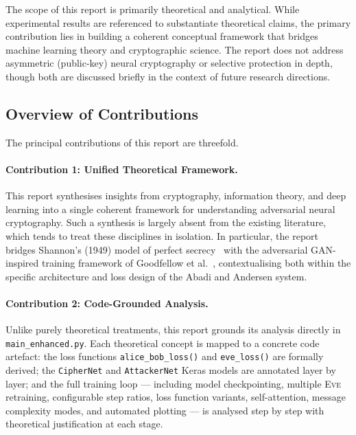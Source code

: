 \documentclass[12pt, a4paper]{article}
\newcommand{\eve}{\textsc{Eve}}
\newcommand{\code}[1]{\texttt{\color{CodeRed}#1}}
\begin{document}
\vspace{0.3cm}

The scope of this report is primarily theoretical and analytical.
While experimental results are referenced to substantiate theoretical
claims, the primary contribution lies in building a coherent conceptual
framework that bridges machine learning theory and cryptographic science.
The report does not address asymmetric (public-key) neural cryptography
or selective protection in depth, though both are discussed briefly in
the context of future research directions.

\subsection{Overview of Contributions}
\label{subsec:contributions}

The principal contributions of this report are threefold.

\paragraph{Contribution 1: Unified Theoretical Framework.}
This report synthesises insights from cryptography, information theory,
and deep learning into a single coherent framework for understanding
adversarial neural cryptography. Such a synthesis is largely absent from
the existing literature, which tends to treat these disciplines in
isolation. In particular, the report bridges Shannon's (1949) model of
perfect secrecy~\cite{shannon1949communication} with the adversarial
GAN-inspired training framework of Goodfellow et
al.~\cite{goodfellow2014generative}, contextualising both within the
specific architecture and loss design of the Abadi and Andersen system.

\paragraph{Contribution 2: Code-Grounded Analysis.}
Unlike purely theoretical treatments, this report grounds its analysis
directly in \code{main\_enhanced.py}. Each theoretical concept is
mapped to a concrete code artefact: the loss functions
\code{alice\_bob\_loss()} and \code{eve\_loss()} are formally
derived; the \code{CipherNet} and \code{AttackerNet} Keras models
are annotated layer by layer; and the full training loop — including
model checkpointing, multiple \eve{} retraining, configurable step
ratios, loss function variants, self-attention, message complexity
modes, and automated plotting — is analysed step by step with
theoretical justification at each stage.
\end{document}
